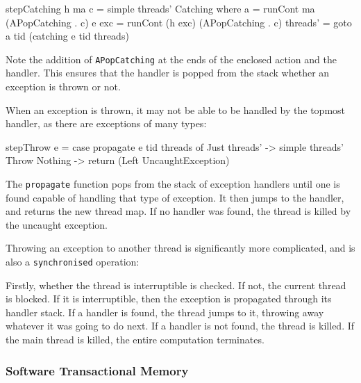 \begin{haskellcode}
stepCatching h ma c = simple threads' Catching where
  a     = runCont ma      (APopCatching . c)
  e exc = runCont (h exc) (APopCatching . c)
  threads' = goto a tid (catching e tid threads)
\end{haskellcode}

Note the addition of \verb|APopCatching| at the ends of the enclosed
action and the handler. This ensures that the handler is popped from
the stack whether an exception is thrown or not.

When an exception is thrown, it may not be able to be handled by the
topmost handler, as there are exceptions of many types:

\begin{haskellcode}
stepThrow e = case propagate e tid threads of
    Just threads' -> simple threads' Throw
    Nothing -> return (Left UncaughtException)
\end{haskellcode}

The \verb|propagate| function pops from the stack of exception
handlers until one is found capable of handling that type of
exception. It then jumps to the handler, and returns the new thread
map. If no handler was found, the thread is killed by the uncaught
exception.

Throwing an exception to another thread is significantly more
complicated, and is also a \verb|synchronised| operation:


Firstly, whether the thread is interruptible is checked. If not, the
current thread is blocked. If it is interruptible, then the exception
is propagated through its handler stack. If a handler is found, the
thread jumps to it, throwing away whatever it was going to do next. If
a handler is not found, the thread is killed. If the main thread is
killed, the entire computation terminates.

\subsubsection{Software Transactional Memory}
\label{sec:execution-stepwise-stm}

